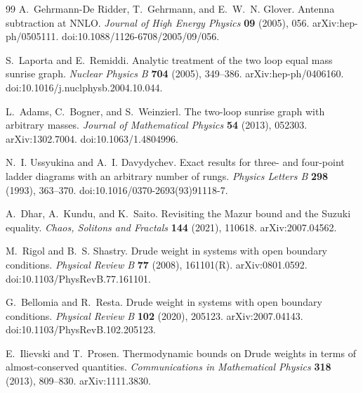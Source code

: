 \begin{thebibliography}{99}
A.~Gehrmann-De Ridder, T.~Gehrmann, and E.~W.~N. Glover.
Antenna subtraction at NNLO.
\emph{Journal of High Energy Physics} \textbf{09} (2005), 056.
arXiv:hep-ph/0505111.
doi:10.1088/1126-6708/2005/09/056.

S.~Laporta and E.~Remiddi.
Analytic treatment of the two loop equal mass sunrise graph.
\emph{Nuclear Physics B} \textbf{704} (2005), 349--386.
arXiv:hep-ph/0406160.
doi:10.1016/j.nuclphysb.2004.10.044.

L.~Adams, C.~Bogner, and S.~Weinzierl.
The two-loop sunrise graph with arbitrary masses.
\emph{Journal of Mathematical Physics} \textbf{54} (2013), 052303.
arXiv:1302.7004.
doi:10.1063/1.4804996.

N.~I. Ussyukina and A.~I. Davydychev.
Exact results for three- and four-point ladder diagrams with an arbitrary
number of rungs.
\emph{Physics Letters B} \textbf{298} (1993), 363--370.
doi:10.1016/0370-2693(93)91118-7.

A.~Dhar, A.~Kundu, and K.~Saito.
Revisiting the Mazur bound and the Suzuki equality.
\emph{Chaos, Solitons and Fractals} \textbf{144} (2021), 110618.
arXiv:2007.04562.

M.~Rigol and B.~S. Shastry.
Drude weight in systems with open boundary conditions.
\emph{Physical Review B} \textbf{77} (2008), 161101(R).
arXiv:0801.0592.
doi:10.1103/PhysRevB.77.161101.

G.~Bellomia and R.~Resta.
Drude weight in systems with open boundary conditions.
\emph{Physical Review B} \textbf{102} (2020), 205123.
arXiv:2007.04143.
doi:10.1103/PhysRevB.102.205123.

E.~Ilievski and T.~Prosen.
Thermodynamic bounds on Drude weights in terms of almost-conserved
quantities.
\emph{Communications in Mathematical Physics} \textbf{318} (2013), 809--830.
arXiv:1111.3830.

\end{thebibliography}
